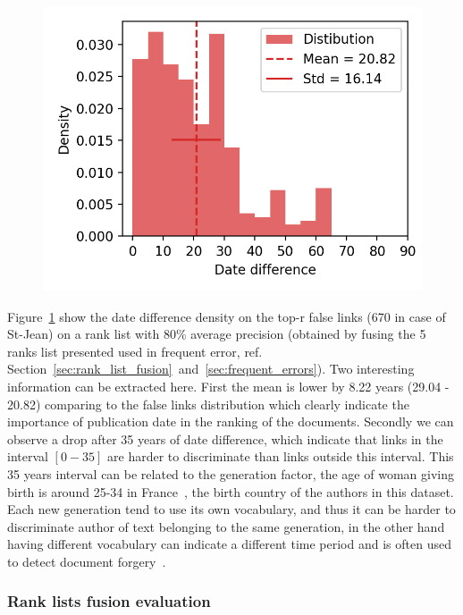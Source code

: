 \begin{figure}
  \label{fig:dates_differences_r_false}
  \includegraphics[width=\linewidth]{img/dates_differences_r_false.png}
\end{figure}

Figure~\ref{fig:dates_differences_r_false} show the date difference density on the top-r false links (670 in case of St-Jean) on a rank list with 80\% average precision (obtained by fusing the 5 ranks list presented used in frequent error, ref. Section~\ref{sec:rank_list_fusion}~and~\ref{sec:frequent_errors}).
Two interesting information can be extracted here.
First the mean is lower by 8.22 years (29.04 - 20.82) comparing to the false links distribution which clearly indicate the importance of publication date in the ranking of the documents.
Secondly we can observe a drop after 35 years of date difference, which indicate that links in the interval $\left[0-35\right]$ are harder to discriminate than links outside this interval.
This 35 years interval can be related to the generation factor, the age of woman giving birth is around 25-34 in France~\cite{generations}, the birth country of the authors in this dataset.
Each new generation tend to use its own vocabulary, and thus it can be harder to discriminate author of text belonging to the same generation, in the other hand having different vocabulary can indicate a different time period and is often used to detect document forgery~\cite{savoy_stylo}.

\subsubsection{Rank lists fusion evaluation}



